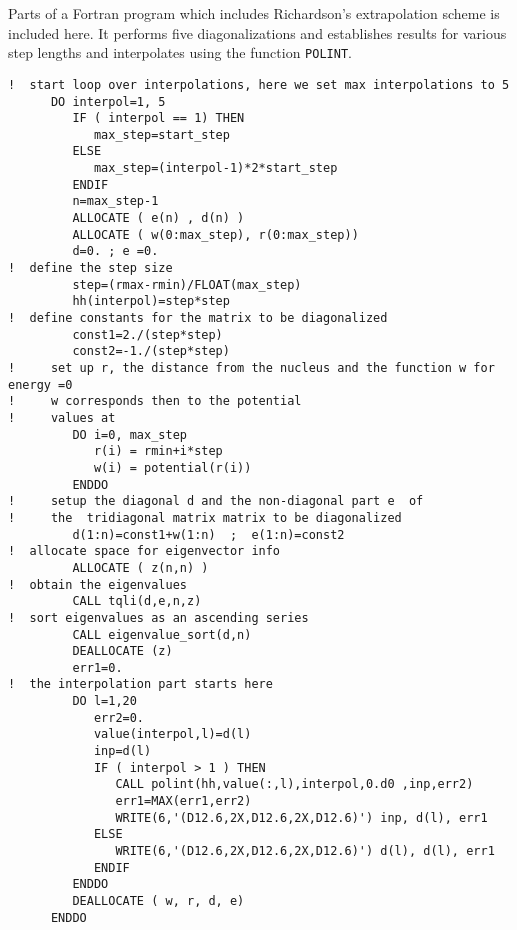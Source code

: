 Parts of a  Fortran program which includes Richardson's extrapolation scheme
is included here. It performs five diagonalizations and establishes results
for various step lengths and interpolates using the function \lstinline{POLINT}.
\lstset{language=[90]Fortran} 
\begin{lstlisting}
!  start loop over interpolations, here we set max interpolations to 5
      DO interpol=1, 5
         IF ( interpol == 1) THEN
            max_step=start_step
         ELSE 
            max_step=(interpol-1)*2*start_step
         ENDIF
         n=max_step-1     
         ALLOCATE ( e(n) , d(n) )
         ALLOCATE ( w(0:max_step), r(0:max_step))
         d=0. ; e =0.
!  define the step size
         step=(rmax-rmin)/FLOAT(max_step)
         hh(interpol)=step*step
!  define constants for the matrix to be diagonalized
         const1=2./(step*step)
         const2=-1./(step*step)
!     set up r, the distance from the nucleus and the function w for energy =0
!     w corresponds then to the potential
!     values at 
         DO i=0, max_step
            r(i) = rmin+i*step
            w(i) = potential(r(i))
         ENDDO
!     setup the diagonal d and the non-diagonal part e  of
!     the  tridiagonal matrix matrix to be diagonalized
         d(1:n)=const1+w(1:n)  ;  e(1:n)=const2
!  allocate space for eigenvector info
         ALLOCATE ( z(n,n) )
!  obtain the eigenvalues
         CALL tqli(d,e,n,z)
!  sort eigenvalues as an ascending series 
         CALL eigenvalue_sort(d,n)
         DEALLOCATE (z) 
         err1=0.
!  the interpolation part starts here
         DO l=1,20
            err2=0.
            value(interpol,l)=d(l)
            inp=d(l)
            IF ( interpol > 1 ) THEN
               CALL polint(hh,value(:,l),interpol,0.d0 ,inp,err2)
               err1=MAX(err1,err2)           
               WRITE(6,'(D12.6,2X,D12.6,2X,D12.6)') inp, d(l), err1 
            ELSE           
               WRITE(6,'(D12.6,2X,D12.6,2X,D12.6)') d(l), d(l), err1
            ENDIF
         ENDDO 
         DEALLOCATE ( w, r, d, e)
      ENDDO
\end{lstlisting}


